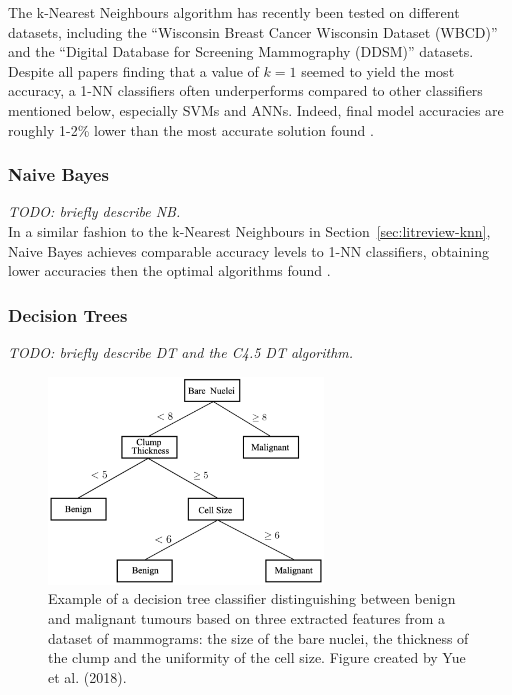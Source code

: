 The k-Nearest Neighbours algorithm has recently been tested on different datasets, including the ``Wisconsin Breast Cancer Wisconsin Dataset (WBCD)'' \cite{Wolberg1995} and the ``Digital Database for Screening Mammography (DDSM)'' \cite{DDSMdataset2001} datasets. Despite all papers finding that a value of $k=1$ seemed to yield the most accuracy, a 1-NN classifiers often underperforms compared to other classifiers mentioned below, especially SVMs and ANNs. Indeed, final model accuracies are roughly 1-2\% lower than the most accurate solution found \cite{Yue2018} \cite{Asri2016} \cite{Montazeri2016}.

\subsubsection{Naive Bayes}

\textit{TODO: briefly describe NB.}\\

In a similar fashion to the k-Nearest Neighbours in Section~\ref{sec:litreview-knn}, Naive Bayes achieves comparable accuracy levels to 1-NN classifiers, obtaining lower accuracies then the optimal algorithms found \cite{Yue2018} \cite{Montazeri2016}.

\subsubsection{Decision Trees}

\textit{TODO: briefly describe DT and the C4.5 DT algorithm.}

\begin{figure}[ht]
\centerline{\includegraphics[width=0.65\textwidth]{Dissertation/figures/litsurvey/dt.png}}
\caption{\label{fig:litsurvey-dt-example}Example of a decision tree classifier distinguishing between benign and malignant tumours based on three extracted features from a dataset of mammograms: the size of the bare nuclei, the thickness of the clump and the uniformity of the cell size. Figure created by Yue et al. (2018).}
\end{figure}

